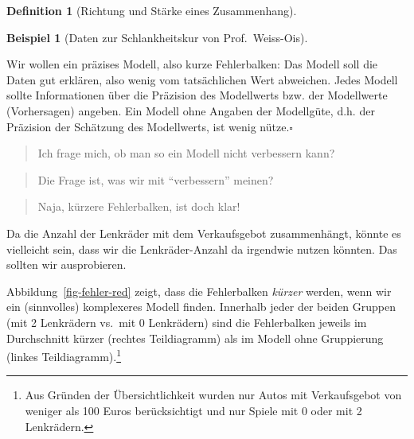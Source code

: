\documentclass[
  a4paper,
  DIV=11]{scrreprt}
\theoremstyle{definition}
\theoremstyle{definition}
\newtheorem{example}{Beispiel}[chapter]
\theoremstyle{definition}
\newtheorem{definition}{Definition}[chapter]
\theoremstyle{remark}
\begin{document}
\begin{definition}[Richtung und Stärke eines
Zusammenhang]
\begin{example}[Daten zur Schlankheitskur von
Prof.~Weiss-Ois]
\end{example}

\begin{tcolorbox}[enhanced jigsaw, leftrule=.75mm, opacitybacktitle=0.6, colback=white, colframe=quarto-callout-important-color-frame, coltitle=black, colbacktitle=quarto-callout-important-color!10!white, opacityback=0, left=2mm, breakable, titlerule=0mm, toptitle=1mm, bottomtitle=1mm, rightrule=.15mm, title=\textcolor{quarto-callout-important-color}{\faExclamation}\hspace{0.5em}{Wichtig}, arc=.35mm, bottomrule=.15mm, toprule=.15mm]

Wir wollen ein präzises Modell, also kurze Fehlerbalken: Das Modell soll
die Daten gut erklären, also wenig vom tatsächlichen Wert abweichen.
Jedes Modell sollte Informationen über die Präzision des Modellwerts
bzw. der Modellwerte (Vorhersagen) angeben. Ein Modell ohne Angaben der
Modellgüte, d.h. der Präzision der Schätzung des Modellwerts, ist wenig
nütze.\(\square\)

\end{tcolorbox}

\begin{quote}
{} Ich frage mich, ob man so ein Modell nicht verbessern
kann?
\end{quote}

\begin{quote}
{} Die Frage ist, was wir mit ``verbessern'' meinen?
\end{quote}

\begin{quote}
{} Naja, kürzere Fehlerbalken, ist doch klar!
\end{quote}

Da die Anzahl der Lenkräder mit dem Verkaufsgebot zusammenhängt, könnte
es vielleicht sein, dass wir die Lenkräder-Anzahl da irgendwie nutzen
könnten. Das sollten wir ausprobieren.

Abbildung~\ref{fig-fehler-red} zeigt, dass die Fehlerbalken
\emph{kürzer} werden, wenn wir ein (sinnvolles) komplexeres Modell
finden. Innerhalb jeder der beiden Gruppen (mit 2 Lenkrädern vs.~mit 0
Lenkrädern) sind die Fehlerbalken jeweils im Durchschnitt kürzer
(rechtes Teildiagramm) als im Modell ohne Gruppierung (linkes
Teildiagramm).\footnote{Aus Gründen der Übersichtlichkeit wurden nur
  Autos mit Verkaufsgebot von weniger als 100 Euros berücksichtigt und
  nur Spiele mit 0 oder mit 2 Lenkrädern.}

\begin{figure}


\end{figure}
\end{definition}
\end{document}
